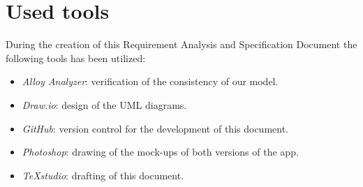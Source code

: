 \chapter{Used tools}
During the creation of this Requirement Analysis and Specification Document the following tools has been utilized:
\begin{itemize}
	\item \emph{Alloy Analyzer}: verification of the consistency of our model.
	\item \emph{Draw.io}: design of the UML diagrams.
	\item \emph{GitHub}: version control for the development of this document.
	\item \emph{Photoshop}: drawing of the mock-ups of both versions of the app.
	\item \emph{TeXstudio}: drafting of this document.
\end{itemize}
